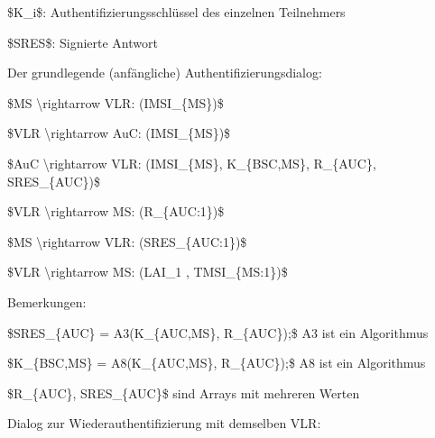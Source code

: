 \documentclass[a4paper]{article}
\begin{document}
\begin{multicols}{3}


      \begin{itemize*}
            \item \$K\_i\$: Authentifizierungsschlüssel des einzelnen Teilnehmers
            \item \$SRES\$: Signierte Antwort
      \end{itemize*}

      Der grundlegende (anfängliche) Authentifizierungsdialog:
      \begin{enumerate*}
            \def\labelenumi{\arabic{enumi}.}
            \item \$MS \textbackslash rightarrow VLR: (IMSI\_\{MS\})\$
            \item \$VLR \textbackslash rightarrow AuC: (IMSI\_\{MS\})\$
            \item \$AuC \textbackslash rightarrow VLR: (IMSI\_\{MS\}, K\_\{BSC,MS\},
            R\_\{AUC\}, SRES\_\{AUC\})\$
            \item \$VLR \textbackslash rightarrow MS: (R\_\{AUC:1\})\$
            \item \$MS \textbackslash rightarrow VLR: (SRES\_\{AUC:1\})\$
            \item \$VLR \textbackslash rightarrow MS: (LAI\_1 , TMSI\_\{MS:1\})\$
      \end{enumerate*}

      \begin{itemize*}
            \item Bemerkungen:
            \begin{itemize*}
                  \item \$SRES\_\{AUC\} = A3(K\_\{AUC,MS\}, R\_\{AUC\});\$ A3 ist ein Algorithmus
                  \item \$K\_\{BSC,MS\} = A8(K\_\{AUC,MS\}, R\_\{AUC\});\$ A8 ist ein Algorithmus
                  \item \$R\_\{AUC\}, SRES\_\{AUC\}\$ sind Arrays mit mehreren Werten
            \end{itemize*}
            \item
            Dialog zur Wiederauthentifizierung mit demselben VLR:


\end{itemize*}
\end{multicols}
\end{document}
